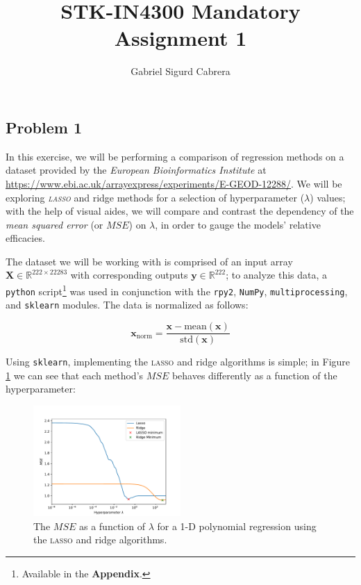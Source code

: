 \documentclass[a4paper,10pt,english]{article}
\begin{document}
\newcommand\esymbol[1]{\begin{circuitikz}
\draw (0,0) to [#1] (1,0); \end{circuitikz}}

\title{STK-IN4300 Mandatory Assignment 1}
\author{Gabriel Sigurd Cabrera}

\maketitle

\begin{multicols*}{2}

\section*{Problem 1}

In this exercise, we will be performing a comparison of regression methods on a dataset provided by the \textit{European Bioinformatics Institute} at \url{https://www.ebi.ac.uk/arrayexpress/experiments/E-GEOD-12288/}.  We will be exploring \textit{\textsc{lasso}} and ridge methods for a selection of hyperparameter ($\lambda$) values; with the help of visual aides, we will compare and contrast the dependency of the \textit{mean squared error} (or $MSE$) on $\lambda$, in order to gauge the models' relative efficacies.

The dataset we will be working with is comprised of an input array $\mathbf{X} \in \mathbb{R}^{222 \times 22283}$ with corresponding outputs $\mathbf{y} \in \mathbb{R}^{222}$; to analyze this data, a \texttt{python} script\footnote{Available in the \textbf{Appendix}.} was used in conjunction with the \texttt{rpy2}, \texttt{NumPy}, \texttt{multiprocessing}, and \texttt{sklearn} modules.  The data is normalized as follows:

\begin{equation*}
\mathbf{x}_\text{norm} = \frac{\mathbf{x} - \text{mean}(\mathbf{x})}{\text{std}(\mathbf{x})}
\end{equation*}

Using \texttt{sklearn}, implementing the \textsc{lasso} and ridge algorithms is simple; in Figure \ref{fig_1} we can see that each method's $MSE$ behaves differently as a function of the hyperparameter:

\begin{figure}[H]
	\centering  
	\includegraphics[width = 0.5\textwidth, center]{../a.pdf}
	\caption{The $MSE$ as a function of $\lambda$ for a 1-D polynomial regression using the \textsc{lasso} and ridge algorithms.}
	\label{fig_1}
\end{figure}


\end{multicols*}
\end{document}

